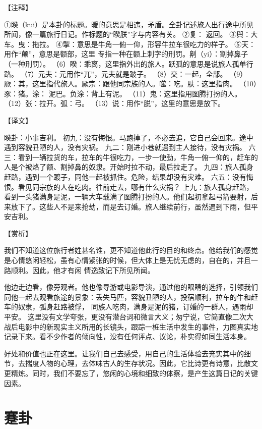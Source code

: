 \documentclass[a4paper,12pt,UTF8,twoside]{ctexbook}
\begin{document}
【注释】

①睽（kui）是本卦的标题。暖的意思是相违，矛盾。全卦记述旅人出行途中所见所闻，像一篇旅行日记。作标题的“睽朕”字与内容有关。
②复： 返回。
③舆：大车。曳：拖拉。
④掣：意思是牛角一俯一仰，形容牛拉车很吃力的样子。
⑤天：用作“颠”，意思是额部，这里 专指一种在额上刺字的刑罚。劓（yi）：割掉鼻子（一种刑罚）。
（6）睽：乖离，这里指外出的旅人。跃孤的意思是说旅人孤单行路。
（7）元夫：元用作“兀”，元夫就是跛子。
（8）交：一起，全部。
（9）厥：其，这里指代旅人。厥宗：跟他同宗族的人。噬：吃。肤：这里指肉。
（10）豕：猪。涂： 泥巴。负涂：背上有泥。
（11）鬼：这里指用图腾打扮的人。
（12）张：拉开。弧：弓。
（13）说：用作“脱”，这里的意思是放下。

【译文】

睽卦：小事吉利。
初九：没有悔恨。马跑掉了，不必去追，它自己会回来。途中遇到容貌丑陋的人，没有灾祸。
九二：刚进小巷就遇到主人接待，没有灾祸。
六三：看到一辆拉货的车，拉车的牛很吃力，一步一使劲，牛角一俯一仰的，赶车的人是个被烙了额、割掉鼻的奴隶。开始时拉不动，最后拉走了。
九四：旅人孤身赶路，遇到一个踱子，同他一起被抓住。危险，结果却没有灾难。
六五：没有悔恨。看见同宗族的人在吃肉。往前走去，哪有什么灾祸？
上九：旅人孤身赶路，看到一头猪满身是泥，一辆大车载满了图腾打扮的人。他们起初拿起弓箭要射，后来放下了。这些人不是来抢劫，而是去订婚。旅人继续前行，虽然遇到下雨，但平安吉利。

【赏析】

我们不知道这位旅行者姓甚名谁，更不知道他此行的目的和终点。他给我们的感觉是心情悠闲轻松，虽有心情紧张的时候，但大体上是无忧无虑的，自在的，并且一路顺利。因此，他才有闲 情逸致记下所见所闻。

他边走边看，像旁观者。他也像导游或电影导演，通过他的眼睛的选择，引领我们同他一起去观看旅途的景象：丢失马匹，容貌丑陋的人，投宿顺利，拉车的牛和赶车的奴隶，弧身赶路被俘， 同族人吃肉，满身是泥的猪，订婚的一群人，遇雨却平安。 这里没有文学夸张，更没有潜台词和微言大义；匆宁说，它简直像二次大战后电影中的新现实主义所用的长镜头，跟踪一桩生活中发生的事件，力图真实地记录下来。看不少作者的倾向性，没有任何评点、议论，朴实得如同生活本身。

好处和价值也正在这里。让我们自己去感受，用自己的生活体验去充实其中的细节，去揣度人物的心理，去体味古人的生存状况。因此，它比诗更有诗意，比散文更精炼。同时，我们不要忘了，悠闲的心境和细致的体察，是产生这篇日记的关键因素。

\chapter{蹇卦}
\end{document}
